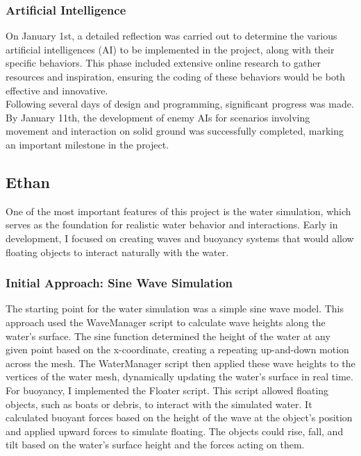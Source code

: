 \documentclass{article}
\begin{document}
\subsubsection{Artificial Intelligence}\hfill

On January 1st, a detailed reflection was carried out to determine the various artificial intelligences (AI) to be implemented in the project, along with their specific behaviors. This phase included extensive online research to gather resources and inspiration, ensuring the coding of these behaviors would be both effective and innovative.\\

Following several days of design and programming, significant progress was made. By January 11th, the development of enemy AIs for scenarios involving movement and interaction on solid ground was successfully completed, marking an important milestone in the project.





\newpage
\subsection{Ethan}\hfill

One of the most important features of this project is the water simulation, which serves as the foundation for realistic water behavior and interactions. Early in development, I focused on creating waves and buoyancy systems that would allow floating objects to interact naturally with the water. 

\subsubsection{Initial Approach: Sine Wave Simulation}\hfill

The starting point for the water simulation was a simple sine wave model. This approach used the WaveManager script to calculate wave heights along the water’s surface. The sine function determined the height of the water at any given point based on the x-coordinate, creating a repeating up-and-down motion across the mesh. The WaterManager script then applied these wave heights to the vertices of the water mesh, dynamically updating the water’s surface in real time.\\

For buoyancy, I implemented the Floater script. This script allowed floating objects, such as boats or debris, to interact with the simulated water. It calculated buoyant forces based on the height of the wave at the object's position and applied upward forces to simulate floating. The objects could rise, fall, and tilt based on the water’s surface height and the forces acting on them.\\
\end{document}
